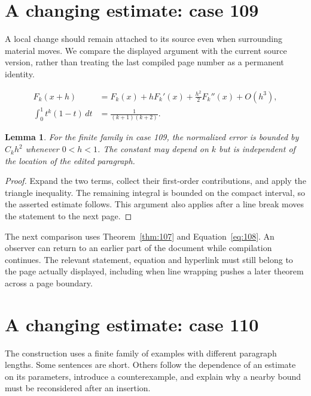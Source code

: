 \documentclass[a4paper,10pt]{article}
\newtheorem{lemma}[theorem]{Lemma}
\begin{document}
\lipsum[13]

\section{A changing estimate: case 109}\label{unit:108}
A local change should remain attached to its source even when surrounding material moves. We compare the displayed argument with the current source version, rather than treating the last compiled page number as a permanent identity.

\lipsum[25-26]
\begin{align}\label{eq:108}
 F_k(x+h)&=F_k(x)+hF_k'(x)+\frac{h^2}{2}F_k''(x)+O(h^3),\\
 \int_0^1 t^k(1-t)\,dt&=\frac{1}{(k+1)(k+2)}.
\end{align}
\begin{lemma}\label{thm:108}
For the finite family in case 109, the normalized error is bounded by $C_k h^2$ whenever $0<h<1$. The constant may depend on $k$ but is independent of the location of the edited paragraph.
\end{lemma}
\begin{proof}
Expand the two terms, collect their first-order contributions, and apply the
triangle inequality. The remaining integral is bounded on the compact interval,
so the asserted estimate follows. This argument also applies after a line break
moves the statement to the next page.
\end{proof}
The next comparison uses Theorem~\ref{thm:107} and Equation~\ref{eq:108}. An observer can return to an earlier part of the document while compilation continues. The relevant statement, equation and hyperlink must still belong to the page actually displayed, including when line wrapping pushes a later theorem across a page boundary.

\lipsum[18]

\section{A changing estimate: case 110}\label{unit:109}
The construction uses a finite family of examples with different paragraph lengths. Some sentences are short. Others follow the dependence of an estimate on its parameters, introduce a counterexample, and explain why a nearby bound must be reconsidered after an insertion.
\end{document}
